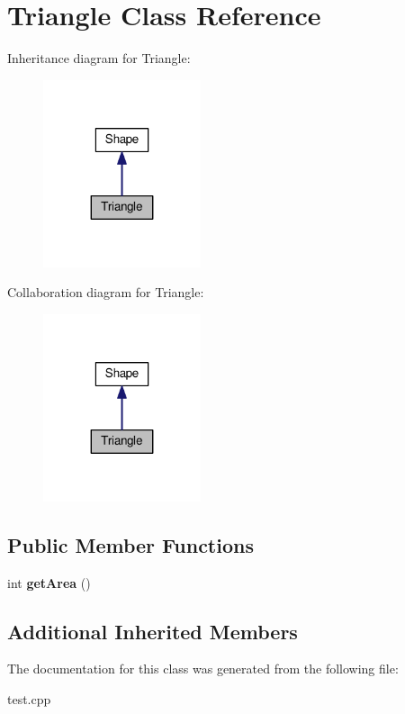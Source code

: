 \hypertarget{classTriangle}{}\section{Triangle Class Reference}
\label{classTriangle}


Inheritance diagram for Triangle\+:
\nopagebreak
\begin{figure}[H]
\begin{center}
\leavevmode
\includegraphics[width=131pt]{classTriangle__inherit__graph}
\end{center}
\end{figure}


Collaboration diagram for Triangle\+:
\nopagebreak
\begin{figure}[H]
\begin{center}
\leavevmode
\includegraphics[width=131pt]{classTriangle__coll__graph}
\end{center}
\end{figure}
\subsection*{Public Member Functions}
\begin{DoxyCompactItemize}
\item 
\mbox{\label{classTriangle_a6007154c3331d1dc99ec24fa07732b78}} 
int {\bfseries get\+Area} ()
\end{DoxyCompactItemize}
\subsection*{Additional Inherited Members}


The documentation for this class was generated from the following file\+:\begin{DoxyCompactItemize}
\item 
test.\+cpp\end{DoxyCompactItemize}

